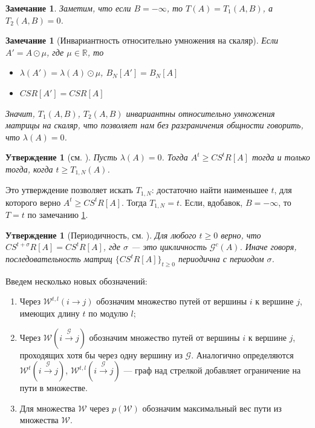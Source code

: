 \documentclass[12pt]{article}
\newtheorem{proposition}[theorem]{Утверждение}
\newtheorem{remark}[theorem]{Замечание}
\begin{document}
\begin{remark}
\label{nullB}
Заметим, что если $B = -\infty$, то $T(A) = T_1(A, B)$, а $T_2(A, B) = 0$.
\end{remark}

\begin{remark}[Инвариантность относительно умножения на скаляр]
\label{invarianceOfT}
Если $A' = A \odot \mu$, где $\mu \in \mathbb{R}$, то 
\begin{itemize}
	\item $\lambda(A') = \lambda(A) \odot \mu$, $B_N[A'] = B_N[A]$
	\item $CSR[A'] = CSR[A]$
\end{itemize}
Значит, $T_1(A, B)$, $T_2(A, B)$ инвариантны относительно умножения матрицы на скаляр, что позволяет нам без разграничения общности говорить, что $\lambda(A) = 0$.
\end{remark}

\begin{proposition} [см. \cite{bounds}]
Пусть $\lambda(A) = 0$. Тогда $A^t \ge CS^tR[A]$ тогда и только тогда, когда $t \ge T_{1,N}(A)$.
\end{proposition}

Это утверждение позволяет искать $T_{1,N}$: достаточно найти наименьшее $t$, для которого верно $A^t \ge CS^tR[A]$. Тогда $T_{1,N} = t$. Если, вдобавок, $B = -\infty$, то $T = t$ по замечанию \ref{nullB}.

\begin{proposition} [Периодичность, см. \cite{21CSRExpansionsOfMatrixPowersInMaxAlgebra}] \label{periodicity}
Для любого $t \ge 0$ верно, что 
$CS^{t+\sigma}R[A] = CS^tR[A]$, где $\sigma$ --- это цикличность $\mathcal{G}^c(A)$. Иначе говоря, последовательность матриц $\{ CS^tR[A]\}_{t\ge0}$ периодична с периодом $\sigma$.
\end{proposition}

Введем несколько новых обозначений:
\begin{enumerate}
    \item Через $\mathcal{W}^{t, l}(i \rightarrow j)$ обозначим множество путей от вершины $i$ к вершине $j$, имеющих длину $t$ по модулю $l$;
    \item Через $\mathcal{W}(i \xrightarrow{\mathcal{G}} j)$ обозначим множество путей от вершины $i$ к вершине $j$, проходящих хотя бы через одну вершину из $\mathcal{G}$. Аналогично определяются $\mathcal{W}^t(i \xrightarrow{\mathcal{G}} j)$, $\mathcal{W}^{t, l}(i \xrightarrow{\mathcal{G}} j)$ --- граф над стрелкой добавляет ограничение на пути в множестве.
    \item Для множества $\mathcal{W}$ через $p(\mathcal{W})$ обозначим максимальный вес пути из множества $\mathcal{W}$.
\end{enumerate}
\end{document}
